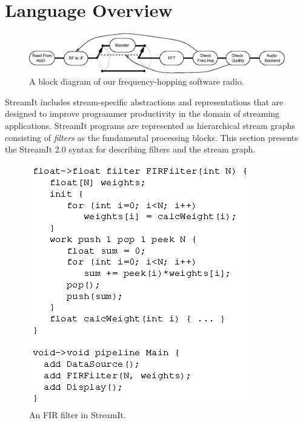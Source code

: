 \section{Language Overview}
\label{sec:overview}

\begin{figure}
  \centering
  \includegraphics[width=\columnwidth]{Radio.eps}
  \caption{A block diagram of our frequency-hopping software radio.}
  \label{fig:radiodiagram}
\end{figure}

StreamIt  includes  stream-specific  abstractions and  representations
that are designed to improve programmer productivity in the domain of
streaming   applications.   StreamIt   programs  are   represented  as
hierarchical  stream  graphs   consisting  of  \emph{filters}  as  the
fundamental processing  blocks. This section
presents the StreamIt 2.0 syntax for describing filters and the stream
graph.

\begin{figure}
  \centering
  \includegraphics{fir-streamit.eps}
  \caption{An FIR filter in StreamIt.}
  \label{fig:firstreamit}
  \makeline
\end{figure}


